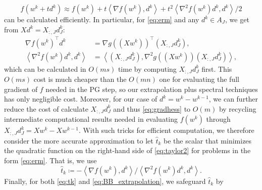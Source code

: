 \documentclass{article}
\theoremstyle{plain}
\theoremstyle{definition}
\theoremstyle{remark}
\newcommand\inner[2]{\left\langle #1, #2 \right\rangle}
\begin{document}
\begin{equation}
	\label{eq:taylor2}
f(w^k + t d^k) \approx f(w^k) + t\inner{\nabla f(w^k)}{d^k} + 
t^2\inner{ \nabla ^2 f(w^k) d^k} { d^k }/2
\end{equation}
can be calculated efficiently.
In particular, for \cref{eq:erm}
and any $d^k \in A_J$, we get from $X d^k = X_{:,J} d^k_J$:
\begin{equation}
\label{eq:gradhess}
\begin{aligned}
	\nabla f(w^k)^{\top} d^k &= \nabla g\left( (X w^k) \right)^{\top}
	\left( X_{:,J} d^k_J \right),\\
	\inner{\nabla^2 f(w^k) d^k}{d^k}  &= \inner{(X_{:,J} d^k_J)}{\nabla^2
		g\left( (Xw^k) \right) (X_{:,J} d^k_J)},
	\end{aligned}
\end{equation}
which can be calculated in $O(ms)$ time by computing $X_{:,J} d^k_J$ first.
This $O(ms)$ cost is much cheaper than
the $O(mn)$ one for evaluating the full gradient of $f$ needed in the
PG step,
so our extrapolation plus spectral techniques has only negligible
cost.
Moreover, for our case of $d^k = w^k - w^{k-1}$,
we can further reduce the cost of calculate $X_{:,J} d^k_J$ and thus
\cref{eq:gradhess} to $O(m)$ by recycling intermediate computational
results needed in evaluating $f(w^k)$ through $X_{:,J} d^k_J = X w^k - X
w^{k-1}$.
With such tricks for efficient computation,
we therefore consider the more accurate approximation
to let $\hat t_k$ be the scalar that minimizes the quadratic function
on the right-hand side of \cref{eq:taylor2} for problems in the form
\cref{eq:erm}. That is, we use
	\begin{equation}
		\label{eq:tk}
		\hat t_k  \coloneqq - \inner{\nabla f(w^k)}{d^k}/ \inner{ 
		\nabla ^2 f(w^k) d^k} { d^k }.
	\end{equation}
Finally, for both \cref{eq:tk} and \cref{eq:BB_extrapolation},
we safeguard $\hat t_k$ by
\end{document}
